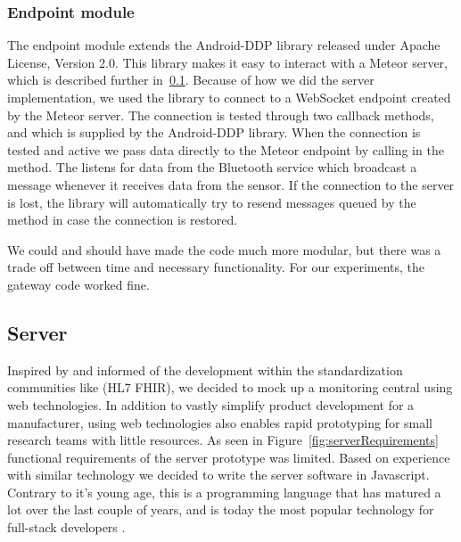 \subsubsection{Endpoint module} %
\label{ssub:endpoint_module}


The endpoint module extends the Android-DDP\cite{android:ddp} library released under Apache License, Version 2.0. This library makes it easy to interact with a Meteor server, which is described further in~\ref{sub:server}. Because of how we did the server implementation, we used the library to connect to a WebSocket endpoint created by the Meteor server. The connection is tested through two callback methods,  and  which is supplied by the Android-DDP library. 
When the connection is tested and active we pass data directly to the Meteor endpoint by calling  in the  method. The  listens for data from the Bluetooth service which broadcast a message whenever it receives data from the sensor. If the connection to the server is lost, the library will automatically try to resend messages queued by the  method in case the connection is restored.

We could and should have made the code much more modular, but there was a trade off between time and necessary functionality. For our experiments, the gateway code worked fine.



\subsection{Server} %
\label{sub:server}

Inspired by \cite{Thelen:2014ew} and informed of the development within the standardization communities like (HL7 FHIR), we decided to mock up a monitoring central using web technologies. In addition to vastly simplify product development for a manufacturer, using web technologies also enables rapid prototyping for small research teams with little resources. As seen in Figure~\ref{fig:serverRequirements} functional requirements of the server prototype was limited. Based on experience with similar technology we decided to write the server software in Javascript. Contrary to it's young age, this is a programming language that has matured a lot over the last couple of years, and is today the most popular technology for full-stack developers \cite{so:survey:results}.

